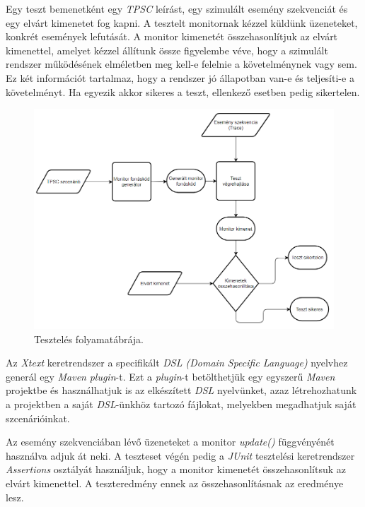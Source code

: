 Egy teszt bemenetként egy \textit{TPSC} leírást, egy szimulált esemény szekvenciát és egy elvárt kimenetet fog kapni.
A tesztelt monitornak kézzel küldünk üzeneteket, konkrét események lefutását.
A monitor kimenetét összehasonlítjuk az elvárt kimenettel, amelyet kézzel állítunk össze figyelembe véve, hogy a szimulált rendszer működésének elméletben meg kell-e felelnie a követelménynek vagy sem.
Ez két információt tartalmaz, hogy a rendszer jó állapotban van-e és teljesíti-e a követelményt.
Ha egyezik akkor sikeres a teszt, ellenkező esetben pedig sikertelen.

\begin{figure}[!ht]
    \centering
    \includegraphics[width=160mm, keepaspectratio]{figures/test_flowchart.png}
    \caption{Tesztelés folyamatábrája.}
    \label{testing_figure}
\end{figure}

Az \textit{Xtext} keretrendszer a specifikált \textit{DSL (Domain Specific Language)} nyelvhez generál egy \textit{Maven} \cite{Maven} \textit{plugin}-t.
Ezt a \textit{plugin}-t betölthetjük egy egyszerű \textit{Maven} projektbe és használhatjuk is az elkészített \textit{DSL} nyelvünket, azaz létrehozhatunk a projektben a saját \textit{DSL}-ünkhöz tartozó fájlokat, melyekben megadhatjuk saját szcenárióinkat.

Az esemény szekvenciában lévő üzeneteket a monitor \textit{update()} függvényénét használva adjuk át neki.
A teszteset végén pedig a \textit{JUnit} \cite{JUnit} tesztelési keretrendszer \textit{Assertions} osztályát használjuk, hogy a monitor kimenetét összehasonlítsuk az elvárt kimenettel.
A teszteredmény ennek az összehasonlításnak az eredménye lesz.

